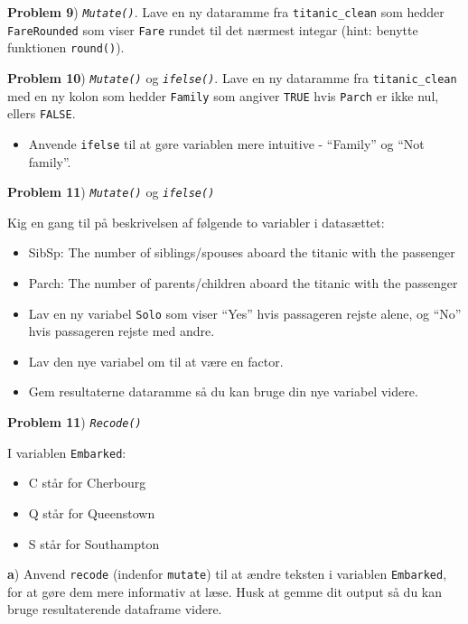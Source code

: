 \documentclass[
]{book}
\providecommand{\tightlist}{%
  \setlength{\itemsep}{0pt}\setlength{\parskip}{0pt}}
\begin{document}
\textbf{Problem 9}) \emph{\texttt{Mutate()}}. Lave en ny dataramme fra \texttt{titanic\_clean} som hedder \texttt{FareRounded} som viser \texttt{Fare} rundet til det nærmest integar (hint: benytte funktionen \texttt{round()}).

\textbf{Problem 10}) \emph{\texttt{Mutate()}} og \emph{\texttt{ifelse()}}. Lave en ny dataramme fra \texttt{titanic\_clean} med en ny kolon som hedder \texttt{Family} som angiver \texttt{TRUE} hvis \texttt{Parch} er ikke nul, ellers \texttt{FALSE}.

\begin{itemize}
\tightlist
\item
  Anvende \texttt{ifelse} til at gøre variablen mere intuitive - ``Family'' og ``Not family''.
\end{itemize}

\textbf{Problem 11}) \emph{\texttt{Mutate()}} og \emph{\texttt{ifelse()}}

Kig en gang til på beskrivelsen af følgende to variabler i datasættet:

\begin{itemize}
\item
  SibSp: The number of siblings/spouses aboard the titanic with the passenger
\item
  Parch: The number of parents/children aboard the titanic with the passenger
\item
  Lav en ny variabel \texttt{Solo} som viser ``Yes'' hvis passageren rejste alene, og ``No'' hvis passageren rejste med andre.
\item
  Lav den nye variabel om til at være en factor.
\item
  Gem resultaterne dataramme så du kan bruge din nye variabel videre.
\end{itemize}

\textbf{Problem 11}) \emph{\texttt{Recode()}}

I variablen \texttt{Embarked}:

\begin{itemize}
\tightlist
\item
  C står for Cherbourg
\item
  Q står for Queenstown
\item
  S står for Southampton
\end{itemize}

\textbf{a}) Anvend \texttt{recode} (indenfor \texttt{mutate}) til at ændre teksten i variablen \texttt{Embarked}, for at gøre dem mere informativ at læse. Husk at gemme dit output så du kan bruge resultaterende dataframe videre.
\end{document}
